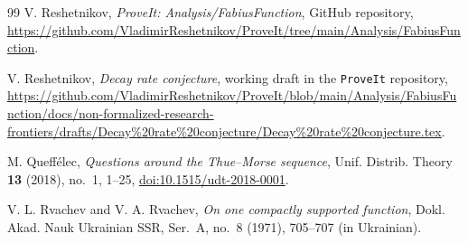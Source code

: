 \documentclass[11pt,oneside]{article}
\theoremstyle{definition}
\theoremstyle{remark}
\begin{document}
\begin{thebibliography}{99}
V. Reshetnikov,
\emph{ProveIt: Analysis/FabiusFunction}, GitHub repository,
\url{https://github.com/VladimirReshetnikov/ProveIt/tree/main/Analysis/FabiusFunction}.

V. Reshetnikov,
\emph{Decay rate conjecture}, working draft in the \texttt{ProveIt} repository,
\url{https://github.com/VladimirReshetnikov/ProveIt/blob/main/Analysis/FabiusFunction/docs/non-formalized-research-frontiers/drafts/Decay%20rate%20conjecture/Decay%20rate%20conjecture.tex}.

M. Queff\'elec,
\emph{Questions around the Thue--Morse sequence},
Unif. Distrib. Theory \textbf{13} (2018), no.~1, 1--25,
\href{https://doi.org/10.1515/udt-2018-0001}{doi:10.1515/udt-2018-0001}.

V. L. Rvachev and V. A. Rvachev,
\emph{On one compactly supported function},
Dokl. Akad. Nauk Ukrainian SSR, Ser.~A, no.~8 (1971), 705--707
(in Ukrainian).

\end{thebibliography}
\end{document}

